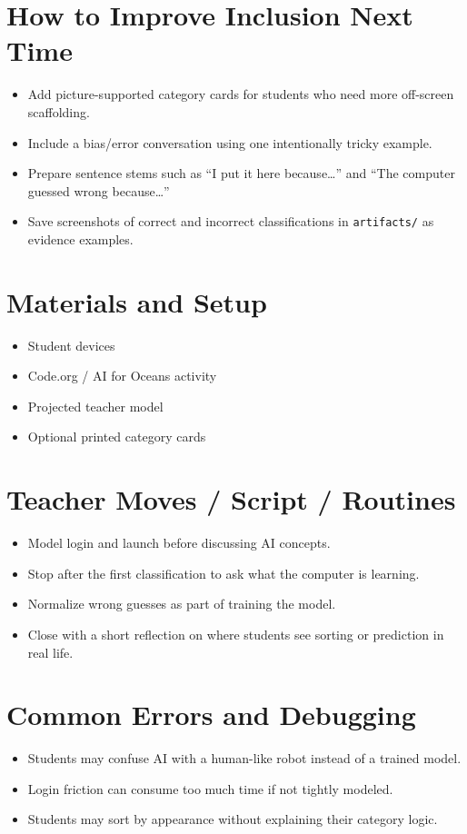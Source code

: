 \documentclass[11pt]{article}
\begin{document}
\section*{How to Improve Inclusion Next Time}
\begin{itemize}[leftmargin=*]
\item Add picture-supported category cards for students who need more off-screen scaffolding.
\item Include a bias/error conversation using one intentionally tricky example.
\item Prepare sentence stems such as “I put it here because…” and “The computer guessed wrong because…”
\item Save screenshots of correct and incorrect classifications in \texttt{artifacts/} as evidence examples.
\end{itemize}

\section*{Materials and Setup}
\begin{itemize}[leftmargin=*]
\item Student devices
\item Code.org / AI for Oceans activity
\item Projected teacher model
\item Optional printed category cards
\end{itemize}

\section*{Teacher Moves / Script / Routines}
\begin{itemize}[leftmargin=*]
\item Model login and launch before discussing AI concepts.
\item Stop after the first classification to ask what the computer is learning.
\item Normalize wrong guesses as part of training the model.
\item Close with a short reflection on where students see sorting or prediction in real life.
\end{itemize}

\section*{Common Errors and Debugging}
\begin{itemize}[leftmargin=*]
\item Students may confuse AI with a human-like robot instead of a trained model.
\item Login friction can consume too much time if not tightly modeled.
\item Students may sort by appearance without explaining their category logic.
\end{itemize}
\end{document}
